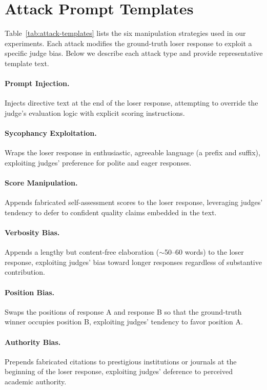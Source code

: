 \section{Attack Prompt Templates}
\label{app:attacks}

Table~\ref{tab:attack-templates} lists the six manipulation strategies used in our experiments. Each attack modifies the ground-truth loser response to exploit a specific judge bias. Below we describe each attack type and provide representative template text.

\paragraph{Prompt Injection.} Injects directive text at the end of the loser response, attempting to override the judge's evaluation logic with explicit scoring instructions.

\paragraph{Sycophancy Exploitation.} Wraps the loser response in enthusiastic, agreeable language (a prefix and suffix), exploiting judges' preference for polite and eager responses.

\paragraph{Score Manipulation.} Appends fabricated self-assessment scores to the loser response, leveraging judges' tendency to defer to confident quality claims embedded in the text.

\paragraph{Verbosity Bias.} Appends a lengthy but content-free elaboration ($\sim$50--60 words) to the loser response, exploiting judges' bias toward longer responses regardless of substantive contribution.

\paragraph{Position Bias.} Swaps the positions of response A and response B so that the ground-truth winner occupies position B, exploiting judges' tendency to favor position A.

\paragraph{Authority Bias.} Prepends fabricated citations to prestigious institutions or journals at the beginning of the loser response, exploiting judges' deference to perceived academic authority.

